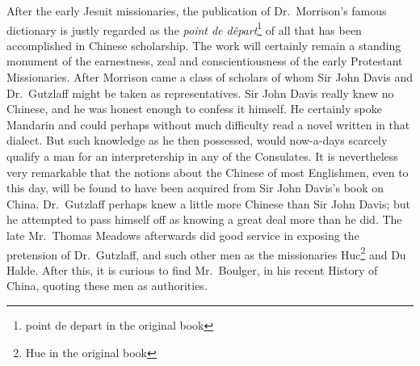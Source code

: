 After the early Jesuit missionaries, the publication of Dr.~Morrison's  famous dictionary is justly regarded as the \emph{point de d\^epart}\footnote{point de depart in the original book}  of all that has been accomplished in Chinese scholarship.
The work will certainly remain a standing monument of the earnestness, zeal and conscientiousness of the early Protestant  Missionaries.
After Morrison came a class of scholars of whom Sir John Davis   and Dr.~Gutzlaff   might be taken as representatives.
Sir John Davis really knew no Chinese, and he was honest enough to confess it himself.
He certainly spoke Mandarin and could perhaps without much difficulty read a novel written in that dialect.
But such knowledge as he then possessed, would now-a-days  scarcely qualify a man for an interpretership in any of the Consulates.
It is nevertheless very remarkable that the notions about the Chinese of most Englishmen, even to this day, will be found to have been acquired from Sir John Davis's book on China.
Dr.~Gutzlaff perhaps knew a little more Chinese than Sir John Davis; but he attempted to pass himself off as knowing a great deal more than he did.
The late Mr.~Thomas Meadows  afterwards did good service in exposing the pretension of Dr.~Gutzlaff, and such other men as the missionaries Huc\footnote{Hue in the original book}  and Du Halde. 
After this, it is curious to find Mr.~Boulger,  in his recent History of China, quoting these men as authorities.

